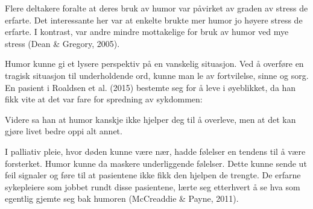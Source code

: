 Flere deltakere foralte at deres bruk av humor var påvirket av graden av stress
de erfarte. Det interessante her var at enkelte brukte mer humor jo høyere
stress de erfarte. I kontrast, var andre mindre mottakelige for bruk av humor
ved mye stress (Dean \&{} Gregory, 2005).

Humor kunne gi et lysere perspektiv på en vanskelig situasjon. Ved å overføre
en tragisk situasjon til underholdende ord, kunne man le av fortvilelse, sinne
og sorg. En pasient i Roaldsen et al. (2015) bestemte seg for å leve i
øyeblikket, da han fikk vite at det var fare for spredning av sykdommen:


Videre sa han at humor kanskje ikke hjelper deg til å overleve, men at det kan
gjøre livet bedre oppi alt annet.

I palliativ pleie, hvor døden kunne være nær, hadde følelser en tendens til å
være forsterket. Humor kunne da maskere underliggende følelser. Dette kunne
sende ut feil signaler og føre til at pasientene ikke fikk den hjelpen de
trengte. De erfarne sykepleiere som jobbet rundt disse pasientene, lærte seg
etterhvert å se hva som egentlig  gjemte seg bak humoren (McCreaddie \&{} Payne,
2011).

